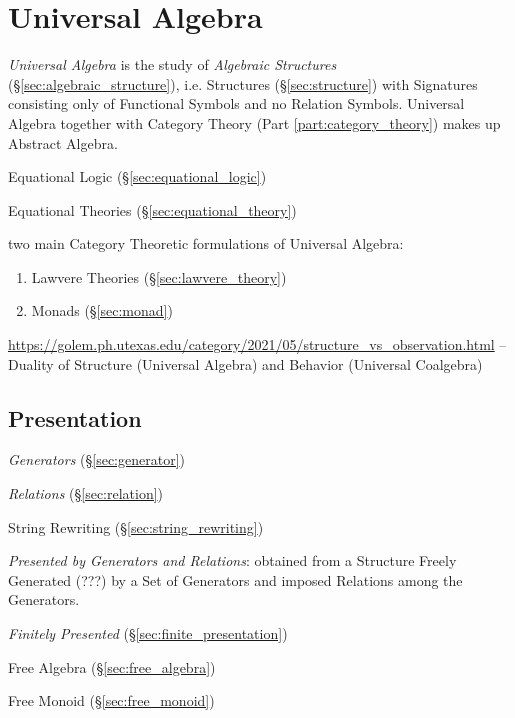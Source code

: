 \section{Universal Algebra}\label{sec:universal_algebra}

\emph{Universal Algebra} is the study of \emph{Algebraic Structures}
(\S\ref{sec:algebraic_structure}), i.e. Structures (\S\ref{sec:structure}) with
Signatures consisting only of Functional Symbols and no Relation Symbols.
Universal Algebra together with Category Theory (Part
\ref{part:category_theory}) makes up Abstract Algebra.

Equational Logic (\S\ref{sec:equational_logic})

Equational Theories (\S\ref{sec:equational_theory})

two main Category Theoretic formulations of Universal Algebra:
\begin{enumerate}
  \item Lawvere Theories (\S\ref{sec:lawvere_theory})
  \item Monads (\S\ref{sec:monad})
\end{enumerate}

\url{https://golem.ph.utexas.edu/category/2021/05/structure_vs_observation.html}
-- Duality of Structure (Universal Algebra) and Behavior (Universal Coalgebra)



\subsection{Presentation}\label{sec:presentation}

\emph{Generators} (\S\ref{sec:generator})

\emph{Relations} (\S\ref{sec:relation})

String Rewriting (\S\ref{sec:string_rewriting}) %

\emph{Presented by Generators and Relations}: obtained from a Structure Freely
Generated (???) by a Set of Generators and imposed Relations among the
Generators.

\emph{Finitely Presented} (\S\ref{sec:finite_presentation})

Free Algebra (\S\ref{sec:free_algebra})

Free Monoid (\S\ref{sec:free_monoid})

